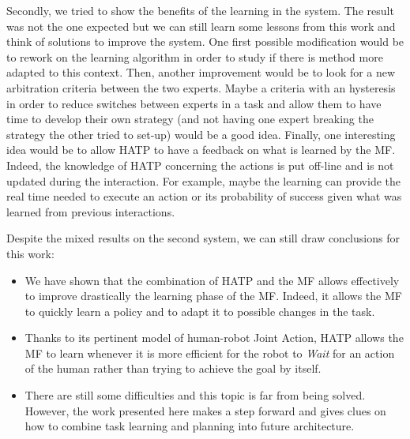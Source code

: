\documentclass[english,a4paper,11pt,twoside]{StyleThese}
\begin{document}
Secondly, we tried to show the benefits of the learning in the system. The result was not the one expected but we can still learn some lessons from this work and think of solutions to improve the system. One first possible modification would be to rework on the learning algorithm in order to study if there is method more adapted to this context. Then, another improvement would be to look for a new arbitration criteria between the two experts.  Maybe a criteria with an hysteresis in order to reduce switches between experts in a task and allow them to have time to develop their own strategy (and not having one expert breaking the strategy the other tried to set-up) would be a good idea. Finally, one interesting idea would be to allow HATP to have a feedback on what is learned by the MF. Indeed, the knowledge of HATP concerning the actions is put off-line and is not updated during the interaction. For example, maybe the learning can provide the real time needed to execute an action or its probability of success given what was learned from previous interactions.

Despite the mixed results on the second system, we can still draw conclusions for this work:
\begin{itemize}
\item We have shown that the combination of HATP and the MF allows effectively to improve drastically the learning phase of the MF. Indeed, it allows the MF to quickly learn a policy and to adapt it to possible changes in the task.
\item Thanks to its pertinent model of human-robot Joint Action, HATP allows the MF to learn whenever it is more efficient for the robot to \textit{Wait} for an action of the human rather than trying to achieve the goal by itself.
\item There are still some difficulties and this topic is far from being solved. However, the work presented here makes a step forward and gives clues on how to combine task learning and planning into future architecture.
\end{itemize}

\ifdefined{}
\else


\end{document}
